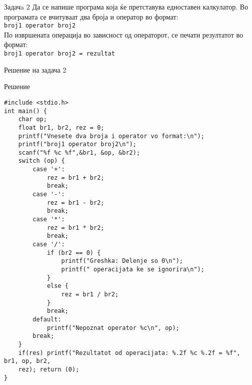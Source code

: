 \begin{frame}{Задачa 2}
Да се напише програма која ќе претставува едноставен калкулатор. Во програмата
се вчитуваат два броја и оператор во формат:\\
\texttt{broj1 operator broj2}\\
По извршената операција во зависност од операторот, се печати резултатот во
формат:\\
\texttt{broj1 operator broj2 = rezultat}
\end{frame}

\begin{frame}[fragile,shrink=10]{Решение на задача 2}
\begin{exampleblock}{Решение}
\begin{lstlisting}
#include <stdio.h>
int main() {
    char op;
    float br1, br2, rez = 0;
    printf("Vnesete dva broja i operator vo format:\n");
    printf("broj1 operator broj2\n");
    scanf("%f %c %f",&br1, &op, &br2);
    switch (op) {
        case '+':
            rez = br1 + br2;
            break;
        case '-':
            rez = br1 - br2;
            break;
        case '*':
            rez = br1 * br2;
            break;
        case '/':
            if (br2 == 0) {
                printf("Greshka: Delenje so 0\n");
                printf(" operacijata ke se ignorira\n");
            }
            else {
                rez = br1 / br2;
            }
            break;
        default:
            printf("Nepoznat operator %c\n", op);
        break;
    }
    if(res) printf("Rezultatot od operacijata: %.2f %c %.2f = %f", br1, op, br2,
    rez); return (0);
}
\end{lstlisting}
\end{exampleblock}
\end{frame}

